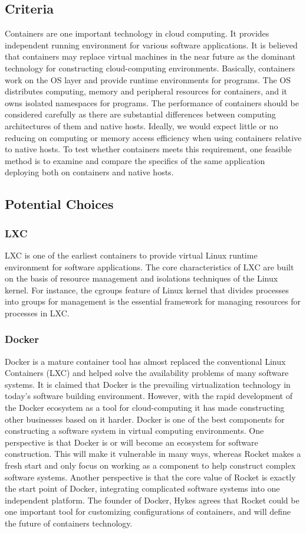\documentclass[letterpaper,10pt]{article}
\begin{document}
	\subsection{Criteria}
  Containers are one important technology in cloud computing. It provides independent running environment for various software applications. It is believed that containers may replace virtual machines in the near future as the dominant technology for constructing cloud-computing environments. Basically, containers work on the OS layer and provide runtime environments for programs. The OS distributes computing, memory and peripheral resources for containers, and it owns isolated namespaces for programs.
  The performance of containers should be considered carefully as there are substantial differences between computing architectures of them and native hosts. Ideally, we would expect little or no reducing on computing or memory access efficiency when using containers relative to native hosts. To test whether containers meets this requirement, one feasible method is to examine and compare the specifics of the same application deploying both on containers and native hosts.

	\subsection{Potential Choices}
		\subsubsection{LXC}
    LXC is one of the earliest containers to provide virtual Linux runtime environment for software applications. The core characteristics of LXC are built on the basis of resource management and isolations techniques of the Linux kernel. For instance, the cgroups feature of Linux kernel that divides processes into groups for management is the essential framework for managing resources for processes in LXC.

		\subsubsection{Docker}
    Docker is a mature container tool has almost replaced the conventional Linux Containers (LXC) and helped solve the availability problems of many software systems. It is claimed that Docker is the prevailing virtualization technology in today’s software building environment. However, with the rapid development of the Docker ecosystem as a tool for cloud-computing it has made constructing other businesses based on it harder.
Docker is one of the best components for constructing a software system in virtual computing environments. One perspective is that Docker is or will become an ecosystem for software construction. This will make it vulnerable in many ways, whereas Rocket makes a fresh start and only focus on working as a component to help construct complex software systems. Another perspective is that the core value of Rocket is exactly the start point of Docker, integrating complicated software systems into one independent platform. The founder of Docker, Hykes agrees that Rocket could be one important tool for customizing configurations of containers, and will define the future of containers technology.
\end{document}
